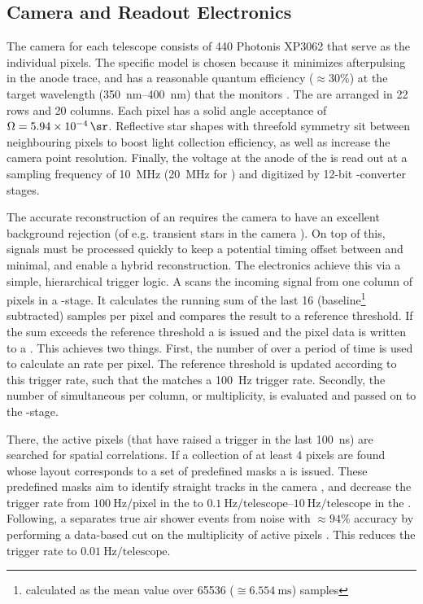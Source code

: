 \subsection{Camera and Readout Electronics}

The camera for each telescope consists of 440 Photonis XP3062 \PMTs that serve 
as the individual pixels. The specific model is chosen because it minimizes 
afterpulsing in the anode trace, and has a reasonable quantum efficiency 
($\approx30\%$) at the target wavelength (\SIrange{350}{400}{\nano\meter}) that 
the \FD monitors \cite{xiaoCalibrationPhotonisXP30622005}. The \PMTs are 
arranged in 22 rows and 20 columns. Each pixel has a solid angle acceptance of 
$\Omega = \SI{5.94e-4}{\sr}$. Reflective star shapes with threefold symmetry 
sit between neighbouring pixels to boost light collection efficiency, as well as
increase the camera point resolution. Finally, the voltage at the anode of the 
\PMTs is read out at a sampling frequency of \SI{10}{\mega\hertz} 
(\SI{20}{\mega\hertz} for \HEAT) and digitized by 12-bit \ADC-converter stages. 

The accurate reconstruction of an \EAS requires the camera to have an excellent 
background rejection (of e.g. transient stars in the camera \FOV). On top of 
this, signals must be processed quickly to keep a potential timing offset 
between \FD and \SD minimal, and enable a hybrid reconstruction. The \FD 
electronics achieve this via a simple, hierarchical trigger logic. A \FPGA 
scans the incoming signal from one column of pixels in a \FLT-stage. It 
calculates the running sum of the last 16 (baseline\footnote{calculated as the 
mean \ADC value over 65536 ($\cong\SI{6.554}{\milli\second}$) samples} 
subtracted) \ADC samples per pixel and compares the result to a reference 
threshold. If the sum exceeds the reference threshold a \FLT is issued and the 
pixel data is written to a \SRAM. This achieves two things. First, the number of
\FLTs over a period of time is used to calculate an \FLT rate per pixel. The 
reference threshold is updated according to this trigger rate, such that the 
\FLT matches a \SI{100}{\hertz} trigger rate. Secondly, the number of 
simultaneous \FLTs per column, or multiplicity, is evaluated and passed on to 
the \SLT-stage.

There, the active pixels (that have raised a trigger in the last 
\SI{100}{\nano\second}) are searched for spatial correlations. If a collection 
of at least 4 pixels are found whose layout corresponds to a set of predefined
masks a \SLT is issued. These predefined masks aim to identify straight tracks 
in the camera \FOV, and decrease the trigger rate from 
$\SI{100}{\hertz\per\mathrm{pixel}}$ in the \FLT to 
$\SIrange[range-units = single]{0.1}{10}{\hertz\per\mathrm{telescope}}$ in the 
\SLT. Following, a \TLT separates true air shower events from noise with 
$\approx94\%$ accuracy by performing a data-based cut on the multiplicity of 
active pixels \cite{abrahamFluorescenceDetectorPierre2010}. This reduces the 
trigger rate to $\SI{0.01}{\hertz\per\mathrm{telescope}}$. 

